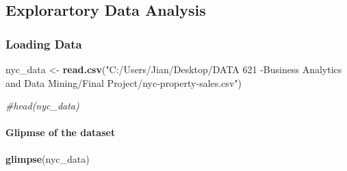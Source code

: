 \documentclass[
]{article}
\newenvironment{Shaded}{\begin{snugshade}}{\end{snugshade}}
\newcommand{\CommentTok}[1]{\textcolor[rgb]{0.56,0.35,0.01}{\textit{#1}}}
\newcommand{\FunctionTok}[1]{\textcolor[rgb]{0.13,0.29,0.53}{\textbf{#1}}}
\newcommand{\NormalTok}[1]{#1}
\newcommand{\OtherTok}[1]{\textcolor[rgb]{0.56,0.35,0.01}{#1}}
\newcommand{\StringTok}[1]{\textcolor[rgb]{0.31,0.60,0.02}{#1}}
\begin{document}
\hypertarget{explorartory-data-analysis}{%
\subsection{Explorartory Data
Analysis}\label{explorartory-data-analysis}}

\hypertarget{loading-data}{%
\subsubsection{Loading Data}\label{loading-data}}

\begin{Shaded}
\begin{Highlighting}[]
\NormalTok{nyc\_data }\OtherTok{\textless{}{-}} \FunctionTok{read.csv}\NormalTok{(}\StringTok{"C:/Users/Jian/Desktop/DATA 621 {-}Business Analytics and Data Mining/Final Project/nyc{-}property{-}sales.csv"}\NormalTok{)}

\CommentTok{\#head(nyc\_data)}
\end{Highlighting}
\end{Shaded}

\hypertarget{glipmse-of-the-dataset}{%
\paragraph{Glipmse of the dataset}\label{glipmse-of-the-dataset}}

\begin{Shaded}
\begin{Highlighting}[]
\FunctionTok{glimpse}\NormalTok{(nyc\_data)}
\end{Highlighting}
\end{Shaded}
\end{document}
